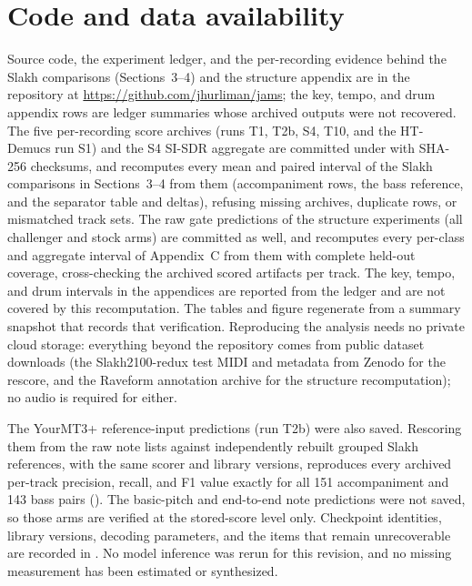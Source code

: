\documentclass[11pt]{article}
\begin{document}
\section*{Code and data availability}
Source code, the experiment ledger, and the per-recording evidence behind the Slakh
comparisons (Sections~3--4) and the structure appendix are in the repository at
\url{https://github.com/jhurliman/jams}; the key, tempo, and drum appendix rows are
ledger summaries whose archived outputs were not recovered. The five
per-recording score archives (runs T1, T2b, S4, T10, and the HT-Demucs run S1) and
the S4 SI-SDR aggregate are committed under  with SHA-256
checksums, and  recomputes every mean and paired
interval of the Slakh comparisons in Sections~3--4 from them (accompaniment rows,
the bass reference, and the separator table and deltas), refusing missing
archives, duplicate rows, or mismatched track sets. The raw gate predictions of
the structure experiments (all challenger and stock arms) are committed as well,
and  recomputes every per-class and aggregate
interval of Appendix~C from them with complete held-out coverage, cross-checking
the archived scored artifacts per track. The key, tempo, and drum intervals in
the appendices are reported from the ledger and are not covered by this
recomputation. The tables and figure regenerate from a summary snapshot that records that
verification. Reproducing the analysis needs no private cloud storage: everything
beyond the repository comes from public dataset downloads (the Slakh2100-redux test
MIDI and metadata from Zenodo for the rescore, and the Raveform annotation archive
for the structure recomputation); no audio is required for either.

The YourMT3+ reference-input predictions (run T2b) were also saved. Rescoring
them from the raw note lists against independently rebuilt grouped Slakh
references, with the same scorer and library versions, reproduces every archived
per-track precision, recall, and F1 value exactly for all 151 accompaniment and 143
bass pairs (). The basic-pitch and end-to-end note
predictions were not saved, so those arms are verified at the stored-score level
only. Checkpoint identities, library versions, decoding parameters, and the items
that remain unrecoverable are recorded in . No model
inference was rerun for this revision, and no missing measurement has been
estimated or synthesized.
\end{document}

